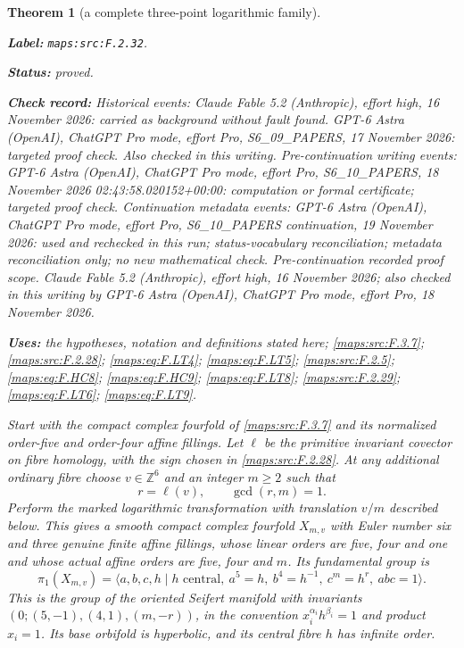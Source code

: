 \documentclass[11pt,a4paper]{article}
\newtheorem{theorem}{Theorem}[section]
\theoremstyle{definition}
\newcommand{\StatementRecord}[4]{\par\smallskip\begingroup\upshape\raggedright\noindent\textbf{Label:} \nolinkurl{#1}.\par\noindent\textbf{Status:} #2.\par\noindent\textbf{Check record:} #3.\par\noindent\textbf{Uses:} #4.\par\endgroup\smallskip}
\begin{document}
\begin{theorem}[a complete three-point logarithmic family]\label{maps:src:F.2.32}
\StatementRecord{maps:src:F.2.32}{proved}{Historical events: Claude Fable 5.2 (Anthropic), effort high, 16 November 2026: carried as background without fault found. GPT-6 Astra (OpenAI), ChatGPT Pro mode, effort Pro, S6\_09\_PAPERS, 17 November 2026: targeted proof check. Also checked in this writing. Pre-continuation writing events: GPT-6 Astra (OpenAI), ChatGPT Pro mode, effort Pro, S6\_10\_PAPERS, 18 November 2026 02:43:58.020152+00:00: computation or formal certificate; targeted proof check. Continuation metadata events: GPT-6 Astra (OpenAI), ChatGPT Pro mode, effort Pro, S6\_10\_PAPERS continuation, 19 November 2026: used and rechecked in this run; status-vocabulary reconciliation; metadata reconciliation only; no new mathematical check. \emph{Pre-continuation recorded proof scope.} Claude Fable 5.2 (Anthropic), effort high, 16 November 2026; also checked in this writing by GPT-6 Astra (OpenAI), ChatGPT Pro mode, effort Pro, 18 November 2026}{the hypotheses, notation and definitions stated here; \cref{maps:src:F.3.7}; \cref{maps:src:F.2.28}; \cref{maps:eq:F.LT4}; \cref{maps:eq:F.LT5}; \cref{maps:src:F.2.5}; \cref{maps:eq:F.HC8}; \cref{maps:eq:F.HC9}; \cref{maps:eq:F.LT8}; \cref{maps:src:F.2.29}; \cref{maps:eq:F.LT6}; \cref{maps:eq:F.LT9}}


Start with the compact complex fourfold of \ref{maps:src:F.3.7} and its
normalized order-five and order-four affine fillings.
Let $\ell$ be the primitive invariant covector on fibre
homology, with the sign chosen in \ref{maps:src:F.2.28}.
At any additional ordinary fibre choose
$v\in\mathbb Z^6$ and an integer $m\ge2$ such that
\[
 r=\ell(v),\qquad \gcd(r,m)=1.
\tag{F.LT1}\label{maps:eq:F.LT1}
\]
Perform the marked logarithmic transformation with
translation $v/m$ described below.
This gives a smooth compact complex fourfold $X_{m,v}$
with Euler number six and three genuine finite affine
fillings, whose linear orders are five, four and one
and whose actual affine orders are five, four and $m$.
Its fundamental group is
\[
 \pi_1(X_{m,v})=
 \langle a,b,c,h\mid h\text{ central},\
   a^5=h,\ b^4=h^{-1},\ c^m=h^r,\ abc=1\rangle .
\tag{F.LT2}\label{maps:eq:F.LT2}
\]
This is the group of the oriented Seifert manifold
with invariants
$(0;(5,-1),(4,1),(m,-r))$, in the convention
$x_i^{\alpha_i}h^{\beta_i}=1$ and product $x_i=1$.
Its base orbifold is hyperbolic, and its central fibre
$h$ has infinite order.


\end{theorem}
\end{document}
